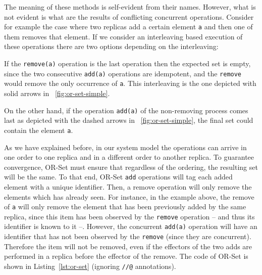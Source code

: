 The meaning of these methods is self-evident from their names.
%
However, what is not evident is what are the results of conflicting
concurrent operations.
%
Consider for example the case where two replicas add a certain element
\lstinline|a| and then one of them removes that element.
%
If we consider an interleaving based execution of these operations
there are two options depending on the interleaving:
\begin{inparaenum}[i)]
\item If the \lstinline|remove(a)| operation is the last operation
  then the expected set is empty, since the two consecutive
  \lstinline|add(a)| operations are idempotent, and the
  \lstinline|remove| would remove the only occurrence of
  \lstinline|a|. This interleaving is the one depicted with solid
  arrows in \figureautorefname~\ref{fig:or-set-simple}.
\item On the other hand, if the operation \lstinline|add(a)| of the
  non-removing process comes last as depicted with the dashed arrows
  in \figureautorefname~\ref{fig:or-set-simple}, the final set could contain the
  element \lstinline|a|.
\end{inparaenum}
As we have explained before, in our system model the operations can
arrive in one order to one replica and in a different order to another
replica.
%
To guarantee convergence, OR-Set must ensure that regardless of the
ordering, the resulting set will be the same.
%
To that end, OR-Set \lstinline|add| operations will tag each added
element with a unique identifier.
%
Then, a remove operation will only remove the elements which has
already seen.
%
For instance, in the example above, the remove of \lstinline|a| will
only remove the element that has been previously added by the same
replica, since this item has been observed by the \lstinline|remove|
operation -- and thus its identifier is known to it --. However, the
concurrent \lstinline|add(a)| operation will have an identifier that
has not been observed by the \lstinline|remove| (since they are
concurrent).
%
Therefore the item will not be removed, even if the
effectors of the two adds are performed in a replica before the effector
of the remove.
%
The code of OR-Set is shown in Listing~\ref{lst:or-set} (ignoring
\lstinline|//@| annotations). 


